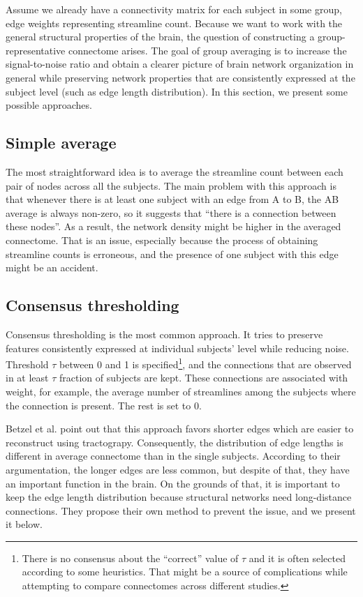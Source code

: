 Assume we already have a connectivity matrix for each subject in some group, edge weights representing streamline count. Because we want to work with the general structural properties of the brain, the question of constructing a group-representative connectome arises. The goal of group averaging is to increase the signal-to-noise ratio and obtain a clearer picture of brain network organization in general while preserving network properties that are consistently expressed at the subject level (such as edge length distribution). \cite{betzel_distance-dependent_2019} In this section, we present some possible approaches.

\subsection{Simple average}\label{sec:average}

The most straightforward idea is to average the streamline count between each pair of nodes across all the subjects. The main problem with this approach is that whenever there is at least one subject with an edge from A to B, the AB average is always non-zero, so it suggests that \enquote{there is a connection between these nodes}. As a result, the network density might be higher in the averaged connectome. That is an issue, especially because the process of obtaining streamline counts is erroneous, and the presence of one subject with this edge might be an accident.

\subsection{Consensus thresholding}\label{sec:cons-thr}

Consensus thresholding is the most common approach. It tries to preserve features consistently expressed at individual subjects' level while reducing noise. Threshold $\tau$ between 0 and 1 is specified\footnote{There is no consensus about the \enquote{correct} value of $\tau$ and it is often selected according to some heuristics. That might be a source of complications while attempting to compare connectomes across different studies.}, and the connections that are observed in at least $\tau$ fraction of subjects are kept. These connections are associated with weight, for example, the average number of streamlines among the subjects where the connection is present. The rest is set to 0. \cite{betzel_distance-dependent_2019}

Betzel et al. point out that this approach favors shorter edges which are easier to reconstruct using tractograpy. Consequently, the distribution of edge lengths is different in average connectome than in the single subjects. According to their argumentation, the longer edges are less common, but despite of that, they have an important function in the brain. On the grounds of that, it is important to keep the edge length distribution because structural networks need long-distance connections. They propose their own method to prevent the issue, and we present it below. \cite{betzel_distance-dependent_2019} 

